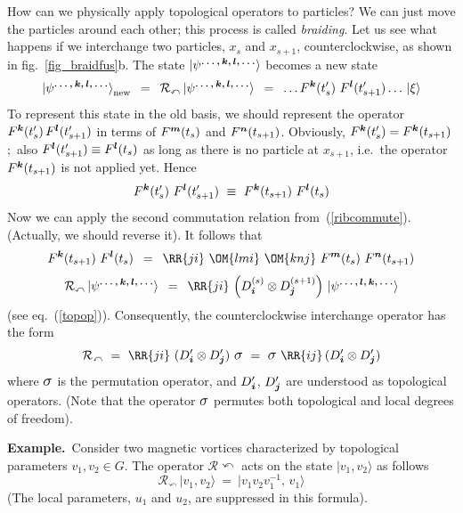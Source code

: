 \documentclass[12pt]{article}
\newcommand{\Sig}{\mbox{\large$\sigma$}}
\newcommand*{\boldind}[1]{{\mbox{\scriptsize\boldmath$#1$}}}
\newcommand*{\RD}[1]{D_\boldind{#1}}
\newcommand*{\RF}[1]{F^\boldind{#1}}
\newcommand*{\PSI}[1]{|\psi^\boldind{#1}\rangle}
\newcommand{\calR}{\mathcal{R}}
\begin{document}
How can we physically apply topological operators to particles? We can just
move the particles around each other; this process is called \emph{braiding}.
Let us see what happens if we interchange two particles, $x_s$ and $x_{s+1}$,
counterclockwise, as shown in fig.~\ref{fig_braidfus}b. The state
$\PSI{\ldots,k,l,\ldots}$ becomes a new state
\[
  \PSI{\ldots,k,l,\ldots}_{\raisebox{-0.3ex}{\scriptsize new}}
  \,\ =\,\  \calR_\curvearrowleft\, \PSI{\ldots,k,l,\ldots}\,\ =\,\ 
  \ldots\RF{k}(t'_s)\ \RF{l}(t'_{s+1})\ldots\,|\xi\rangle
\]
To represent this state in the old basis, we should represent the operator
$\RF{k}(t'_s)\,\RF{l}(t'_{s+1})$ in terms of $\RF{m}(t_s)$ and
$\RF{n}(t_{s+1})$. Obviously, $\RF{k}(t'_s)=\RF{k}(t_{s+1})$;\, also
$\RF{l}(t'_{s+1})\equiv\RF{l}(t_s)$ as long as there is no particle
at $x_{s+1}$, i.e.\ the operator $\RF{k}(t_{s+1})$ is not applied yet. Hence
\[
  \RF{k}(t'_s)\ \RF{l}(t'_{s+1})\ \equiv\ 
  \RF{k}(t_{s+1})\ \RF{l}(t_s)
\]
Now we can apply the second commutation relation from~(\ref{ribcommute}). 
(Actually, we should reverse it). It follows that
\[
  \RF{k}(t_{s+1})\ \RF{l}(t_s)\,\ =\,\ 
  \RR{ji}\ \OM{lmi}\ \OM{knj}\
  \RF{m}(t_{s})\ \RF{n}(t_{s+1})  
\]
\[
  \calR_\curvearrowleft\, \PSI{\ldots,k,l,\ldots}
  \,\ =\,\
  \RR{ji}\ \Bigl(\RD{i}^{(s)}\otimes\RD{j}^{(s+1)}\Bigr)\ 
  \PSI{\ldots,l,k,\ldots}
\]
(see eq.~(\ref{topop})). Consequently, the counterclockwise interchange
operator has the form
\begin{equation} \label{interchange}
  \calR_\curvearrowleft\ =\ \RR{ji}\ (\RD{i}'\otimes\RD{j}')\ \Sig\ =\  
  \Sig\ \RR{ij}\, (\RD{i}'\otimes\RD{j}')
\end{equation}
where $\Sig$ is the permutation operator, and $\RD{i}'$, $\RD{j}'$ are
understood as topological operators. (Note that the operator $\Sig$ permutes
both topological and local degrees of freedom).
\smallskip

\noindent\textbf{Example.}\, Consider two magnetic vortices characterized by
topological parameters $v_1,v_2\in G$. The operator $\calR\curvearrowleft$ 
acts on the state $|v_1,v_2\rangle$ as follows
\begin{equation} \label{vortinterchange}
  \calR_\curvearrowleft\,|v_1,v_2\rangle\ =\ |v_1v_2v_1^{-1},\,v_1\rangle
\end{equation}
(The local parameters, $u_1$ and $u_2$, are suppressed in this formula).
\smallskip
\end{document}

